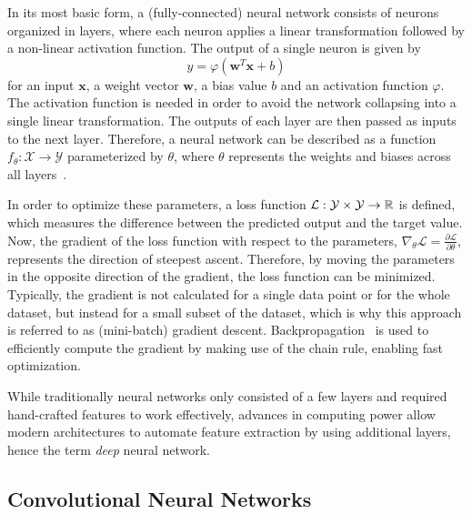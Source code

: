 In its most basic form, a (fully-connected) neural network consists of neurons organized in layers, where each neuron
applies a linear transformation followed by a non-linear activation function.
The output of a single neuron is given by
\begin{equation}
    y = \varphi(\mathbf{w}^T\mathbf{x} + b)
\end{equation}
for an input $\mathbf{x}$, a weight vector $\mathbf{w}$, a bias value $b$ and an activation function $\varphi$. 
The activation function is needed in order to avoid the network collapsing into a single linear transformation. 
The outputs of each layer are then passed as inputs to the next layer. 
Therefore, a neural network can be described as a function $f_{\theta}: \mathcal{X} \rightarrow \mathcal{Y}$ 
parameterized by $\theta$, where $\theta$ represents the weights and biases across all layers~\cite{DeepLearning}.

In order to optimize these parameters, a loss function $\mathcal{L}: \mathcal{Y} \times \mathcal{Y} \rightarrow \mathbb{R}$ is 
defined, which measures the difference between the predicted output and the target value. 
Now, the gradient of the loss function with respect to the parameters, 
$\nabla_\theta \mathcal{L} = \frac{\partial \mathcal{L}}{\partial \theta}$, represents the direction of steepest ascent.
Therefore, by moving the parameters in the opposite direction of the gradient, the loss function can be minimized.
Typically, the gradient is not calculated for a single data point or for the whole dataset, but instead for a
small subset of the dataset, which is why this approach is referred to as (mini-batch) gradient descent.
Backpropagation~\cite{Backpropagation} is used to efficiently compute the gradient by making use of the
chain rule, enabling fast optimization.

While traditionally neural networks only consisted of a few layers and required hand-crafted features to work 
effectively, advances in computing power allow modern architectures to automate feature extraction by using additional 
layers, hence the term \textit{deep} neural network.

\subsection{Convolutional Neural Networks}

